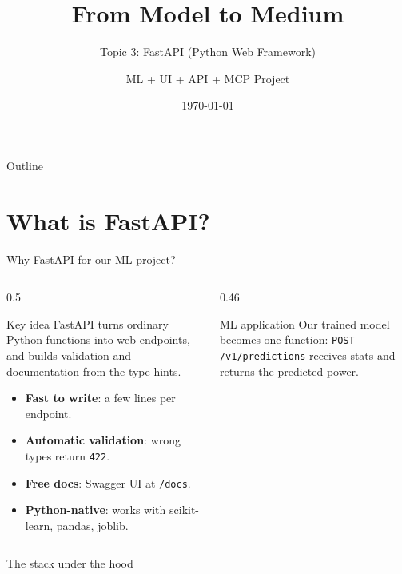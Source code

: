\documentclass[aspectratio=169,10pt]{beamer}
\title[FastAPI]{From Model to Medium}
\subtitle{Topic 3: FastAPI (Python Web Framework)}
\author{ML + UI + API + MCP Project}
\institute{Learning Path}
\date{\today}
\begin{document}
\begin{frame}
\titlepage
\end{frame}

\begin{frame}{Outline}
\tableofcontents
\end{frame}

\section{What is FastAPI?}

\begin{frame}{Why FastAPI for our ML project?}
\begin{columns}[T]
\begin{column}{0.5\textwidth}
\begin{block}{Key idea}
FastAPI turns ordinary Python functions into web endpoints, and builds validation and documentation from the type hints.
\end{block}
\begin{itemize}
\item \textbf{Fast to write}: a few lines per endpoint.
\item \textbf{Automatic validation}: wrong types return \texttt{422}.
\item \textbf{Free docs}: Swagger UI at \texttt{/docs}.
\item \textbf{Python-native}: works with scikit-learn, pandas, joblib.
\end{itemize}
\end{column}
\begin{column}{0.46\textwidth}
\begin{alertblock}{ML application}
Our trained model becomes one function: \texttt{POST /v1/predictions} receives stats and returns the predicted power.
\end{alertblock}
\end{column}
\end{columns}
\end{frame}

\begin{frame}{The stack under the hood}
\begin{center}
\end{center}
\end{frame}
\end{document}
